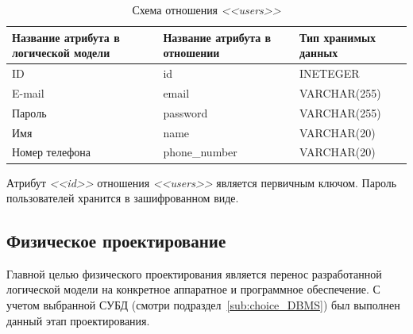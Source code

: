 \begin{table}[h]
  \caption{Схема отношения \textit{<<users>>}}
  \label{tbl:users_scheme}
  \small{
    \centering
    \begin{tabular}{| p{} | p{} | p{} |}
      \hline
      Название атрибута в \newline логической модели &
      Название атрибута в \newline отношении &
      Тип хранимых данных \\

      \hline
      ID & id & INETEGER \\

      \hline
      E-mail & email & VARCHAR(255) \\

      \hline
      Пароль & password & VARCHAR(255) \\

      \hline
      Имя & name & VARCHAR(20) \\

      \hline
      Номер телефона & phone\_number & VARCHAR(20) \\

      \hline
    \end{tabular}
    }
\end{table}

Атрибут \textit{<<id>>} отношения \textit{<<users>>} является первичным ключом.
Пароль пользователей хранится в зашифрованном виде.

\subsection{Физическое проектирование}
\label{sub:db_structure_physical_design}

Главной целью физического проектирования является перенос разработанной логической модели
на конкретное аппаратное и программное обеспечение. С учетом выбранной СУБД (смотри
подраздел~\ref{sub:choice_DBMS}) был выполнен данный этап проектирования.

\pagebreak
